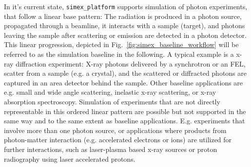 \documentclass[12pt]{scrartcl}
\begin{document}
In it's current state, \texttt{simex\_platform} supports simulation of
photon experiments, that follow a linear base pattern: The radiation is produced
in a photon source, propagated through a beamline, it interacts with a sample
(target), and photons leaving the sample after scattering or emission are
detected in a photon detector. This linear progression, depicted in
Fig.~\ref{fig:simex_baseline_workflow} will be referred to as
the simulation  baseline in the following. A typical example is a x-ray diffraction
experiment: X-ray photons delivered by a synchrotron or an FEL, scatter from a
sample (e.g. a crystal), and the scattered or diffracted photons are captured in
an area detector behind the sample. Other baseline applications are e.g. small
and wide angle scattering, inelastic x-ray scattering, or x-ray absorption
spectroscopy. Simulation of experiments that are not directly
representable in this ordered linear pattern are possible but not supported in the same way and
to the same extent as baseline applications. E.g.
experiments that involve more than one photon source, or applications where
products from photon-matter interaction (e.g. accelerated electrons or ions) are
utilized for further interactions, such as laser-plasma based x-ray sources or
proton radiography using laser accelerated protons.
\end{document}
